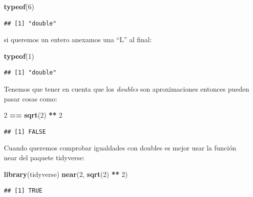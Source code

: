 \documentclass[]{book}
\newenvironment{Shaded}{\begin{snugshade}}{\end{snugshade}}
\newcommand{\KeywordTok}[1]{\textcolor[rgb]{0.13,0.29,0.53}{\textbf{#1}}}
\newcommand{\DecValTok}[1]{\textcolor[rgb]{0.00,0.00,0.81}{#1}}
\newcommand{\StringTok}[1]{\textcolor[rgb]{0.31,0.60,0.02}{#1}}
\newcommand{\OperatorTok}[1]{\textcolor[rgb]{0.81,0.36,0.00}{\textbf{#1}}}
\newcommand{\NormalTok}[1]{#1}
\theoremstyle{definition}
\theoremstyle{definition}
\theoremstyle{definition}
\theoremstyle{remark}
\begin{document}
\begin{Shaded}
\begin{Highlighting}[]
\KeywordTok{typeof}\NormalTok{(}\DecValTok{6}\NormalTok{)}
\end{Highlighting}
\end{Shaded}

\begin{verbatim}
## [1] "double"
\end{verbatim}

si queremos un entero anexamos una ``L'' al final:

\begin{Shaded}
\begin{Highlighting}[]
\KeywordTok{typeof}\NormalTok{(}\DecValTok{1}\NormalTok{)}
\end{Highlighting}
\end{Shaded}

\begin{verbatim}
## [1] "double"
\end{verbatim}

Tenemos que tener en cuenta que los \emph{doubles} son aproximaciones
entonces pueden pasar cosas como:

\begin{Shaded}
\begin{Highlighting}[]
\DecValTok{2} \OperatorTok{==}\StringTok{ }\KeywordTok{sqrt}\NormalTok{(}\DecValTok{2}\NormalTok{) }\OperatorTok{**}\StringTok{ }\DecValTok{2}
\end{Highlighting}
\end{Shaded}

\begin{verbatim}
## [1] FALSE
\end{verbatim}

Cuando queremos comprobar igualdades con doubles es mejor usar la
función near del paquete tidyverse:

\begin{Shaded}
\begin{Highlighting}[]
\KeywordTok{library}\NormalTok{(tidyverse)}
\KeywordTok{near}\NormalTok{(}\DecValTok{2}\NormalTok{, }\KeywordTok{sqrt}\NormalTok{(}\DecValTok{2}\NormalTok{) }\OperatorTok{**}\StringTok{ }\DecValTok{2}\NormalTok{)}
\end{Highlighting}
\end{Shaded}

\begin{verbatim}
## [1] TRUE
\end{verbatim}
\end{document}
